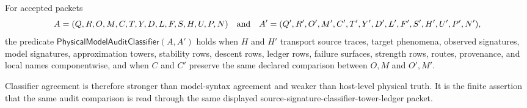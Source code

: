 \begin{definition}
\label{def:physical-model-audit-classifier}
For accepted packets
$$
A=(Q,R,O,M,C,T,Y,D,L,F,S,H,U,P,N)
\quad\hbox{and}\quad
A'=(Q',R',O',M',C',T',Y',D',L',F',S',H',U',P',N'),
$$
the predicate $\mathsf{PhysicalModelAuditClassifier}(A,A')$ holds when $H$ and $H'$ transport source traces, target phenomena, observed signatures, model signatures, approximation towers, stability rows, descent rows, ledger rows, failure surfaces, strength rows, routes, provenance, and local names componentwise, and when $C$ and $C'$ preserve the same declared comparison between $O,M$ and $O',M'$.

Classifier agreement is therefore stronger than model-syntax agreement and weaker than host-level physical truth. It is the finite assertion that the same audit comparison is read through the same displayed source-signature-classifier-tower-ledger packet.
\end{definition}

